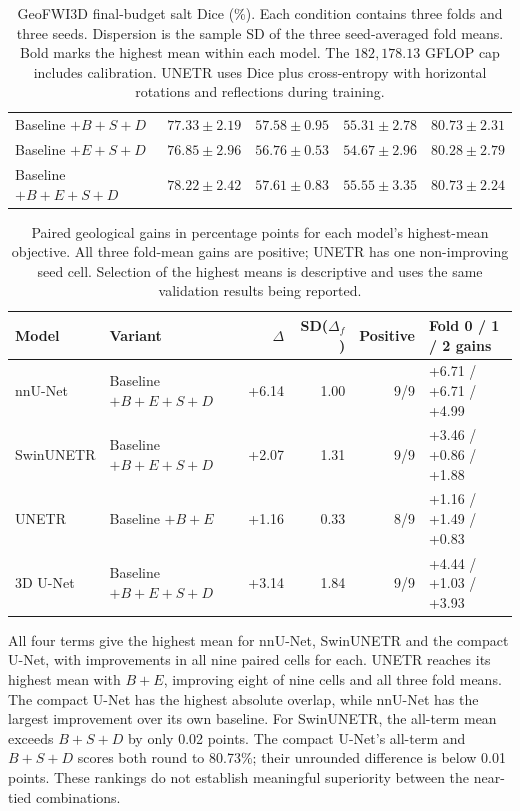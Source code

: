 \documentclass[12pt,a4paper]{article}
\begin{document}
\begin{table}[htbp]
\begin{tabular}{@{}lrrrr@{}}
Baseline $+B+S+D$ & $77.33\pm2.19$ & $57.58\pm0.95$ & $55.31\pm2.78$ & $80.73\pm2.31$ \\
Baseline $+E+S+D$ & $76.85\pm2.96$ & $56.76\pm0.53$ & $54.67\pm2.96$ & $80.28\pm2.79$ \\
Baseline $+B+E+S+D$ & $\mathbf{78.22\pm2.42}$ & $\mathbf{57.61\pm0.83}$ & $55.55\pm3.35$ & $\mathbf{80.73\pm2.24}$ \\
\hline
\end{tabular}
\caption{GeoFWI3D final-budget salt Dice (\%). Each condition contains
three folds and three seeds. Dispersion is the sample SD of the three
seed-averaged fold means. Bold marks the highest mean within each model.
The $182{,}178.13$ GFLOP cap includes calibration. UNETR uses
Dice plus cross-entropy with horizontal rotations and reflections during
training.}
\label{tab:geo-matrix}
\end{table}
\begin{table}[htbp]
\centering\footnotesize{}
\setlength{\tabcolsep}{5pt}
\begin{tabular}{@{}llrrrl@{}}
\hline
Model & Variant & $\Delta$ & SD($\Delta_f$) & Positive & Fold 0 / 1 / 2 gains \\
\hline
nnU-Net & Baseline $+B+E+S+D$ & +6.14 & 1.00 & 9/9 & +6.71 / +6.71 / +4.99 \\
SwinUNETR & Baseline $+B+E+S+D$ & +2.07 & 1.31 & 9/9 & +3.46 / +0.86 / +1.88 \\
UNETR & Baseline $+B+E$ & +1.16 & 0.33 & 8/9 & +1.16 / +1.49 / +0.83 \\
3D U-Net & Baseline $+B+E+S+D$ & +3.14 & 1.84 & 9/9 & +4.44 / +1.03 / +3.93 \\
\hline
\end{tabular}
\caption{Paired geological gains in percentage points for each model's
highest-mean objective. All three fold-mean gains are positive; UNETR
has one non-improving seed cell. Selection of the highest means is
descriptive and uses the same validation results being reported.}
\label{tab:geo-best}
\end{table}

All four terms give the highest mean for nnU-Net, SwinUNETR and the
compact U-Net, with improvements in all nine paired cells for each.
UNETR reaches its highest mean with $B+E$, improving eight of nine
cells and all three fold means. The compact U-Net has the highest
absolute overlap, while nnU-Net has the largest improvement over its
own baseline. For SwinUNETR, the all-term mean exceeds $B+S+D$ by
only 0.02 points. The compact U-Net's all-term and $B+S+D$ scores
both round to 80.73\%; their unrounded difference is below 0.01
points. These rankings do not establish meaningful superiority
between the near-tied combinations.
\end{document}
